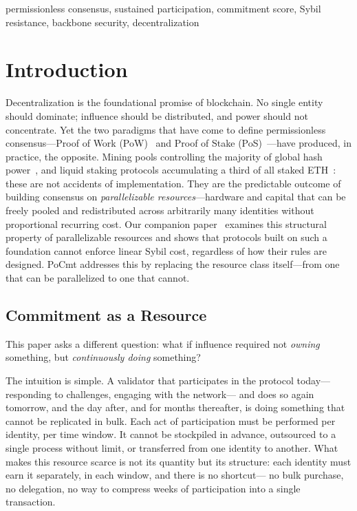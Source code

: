 \documentclass[10pt,journal,twoside]{IEEEtran}
\theoremstyle{remark}
\begin{document}
	\begin{IEEEkeywords}
		permissionless consensus, sustained participation,
		commitment score, Sybil resistance, backbone security,
		decentralization
	\end{IEEEkeywords}
	
	
	\section{Introduction}
	\label{sec:intro}
	
	Decentralization is the foundational promise of blockchain.
	No single entity should dominate; influence should be
	distributed, and power should not concentrate.
	Yet the two paradigms that have come to define permissionless
	consensus---Proof of Work
	(PoW)~\cite{nakamoto2008bitcoin,garay2015bitcoin,
		garay2020analysis} and Proof of Stake
	(PoS)~\cite{kiayias2017ouroboros,david2018praos,
		badertscher2018genesis}---have produced, in practice,
	the opposite.
	Mining pools controlling the majority of global hash
	power~\cite{gencer2018decentralization}, and liquid staking
	protocols accumulating a third of all staked
	ETH~\cite{wahrstatter2023lido}: these are not accidents of
	implementation.
	They are the predictable outcome of building consensus on
	\emph{parallelizable resources}---hardware and capital
	that can be freely pooled and redistributed across
	arbitrarily many identities without proportional recurring
	cost.
	Our companion paper~\cite{maleki2025scarcity} examines
	this structural property of parallelizable resources and
	shows that protocols built on such a foundation cannot
	enforce linear Sybil cost, regardless of how their rules
	are designed.
	PoCmt addresses this by replacing the resource class
	itself---from one that can be parallelized to one that
	cannot.
	
	\subsection{Commitment as a Resource}
	
	This paper asks a different question: what if influence
	required not \emph{owning} something, but
	\emph{continuously doing} something?
	
	The intuition is simple.
	A validator that participates in the protocol today---
	responding to challenges, engaging with the network---
	and does so again tomorrow, and the day after, and for
	months thereafter, is doing something that cannot be
	replicated in bulk.
	Each act of participation must be performed per identity,
	per time window.
	It cannot be stockpiled in advance, outsourced to a single
	process without limit, or transferred from one identity to
	another.
	What makes this resource scarce is not its quantity
	but its structure: each identity must earn it
	separately, in each window, and there is no shortcut---
	no bulk purchase, no delegation, no way to compress
	weeks of participation into a single transaction.
	
\end{document}
